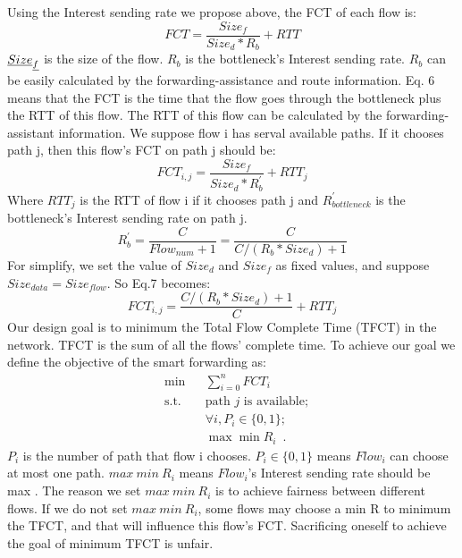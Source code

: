 Using the Interest sending rate we propose above, the FCT of each flow is:
\begin{equation}
FCT=\frac{Size_{f}}{Size_{d}\ast{R_{b}}}+RTT
\end{equation}
$\emph{Size}_{\emph{f}}$ is the size of the flow. $R_{b}$ is the bottleneck's Interest sending rate. $R_{b}$ can be easily calculated by the forwarding-assistance and route information. Eq. 6 means that the FCT is the time that the flow goes through the bottleneck plus the RTT of this flow. The RTT of this flow can be calculated by the forwarding-assistant information.
We suppose flow i has serval available paths. If it chooses path j, then this flow's FCT on path j should be:
\begin{equation}
FCT_{i,j}=\frac{Size_{f}}{Size_{d}\ast{R^{'}_{b}}}+RTT_j
\end{equation}
Where $RTT_j$ is the RTT of flow i if it chooses path j and $R^{'}_{bottleneck}$ is the bottleneck's Interest sending rate on path j.
\begin{equation}
R^{'}_{b}=\frac{C}{Flow_{num}+1}
=\frac{C}{C/(R_{b}\ast{Size_{d}})+1}
\end{equation}
For simplify, we set the value of $Size_{d}$ and $Size_{f}$ as fixed values, and suppose $Size_{data} =Size_{flow}$. So Eq.7 becomes:
\begin{equation}
FCT_{i,j}=\frac{C/(R_{b}*Size_{d})+1}{C}+RTT_j
\end{equation}
Our design goal is to minimum the Total Flow Complete Time (TFCT) in the network. TFCT is the sum of all the flows' complete time. To achieve our goal we define the objective of the smart forwarding as:
\begin{equation}\begin{aligned}
& \min &&  \sum_{i=0}^{n} FCT_i \\
& \text{s.t.}  && \text{path } j \text{ is available};\\
&              && \forall i, P_i \in \{0,1\};\\
&              && \max \min  R_i \enspace .
\end{aligned}
\end{equation}
$P_i$ is the number of path that flow i chooses. $P_i \in \{0,1\}$ means $Flow_i$ can choose at most one path. $max \ min \ R_i$ means $Flow_{i}$'s Interest sending rate should be max . The reason we set $max \ min \ R_i$ is to achieve fairness between different flows.  If we do not set $max \ min \ R_i$, some flows may choose a min R to minimum the TFCT, and that will influence this flow's FCT. Sacrificing oneself to achieve the goal of minimum TFCT is unfair.

